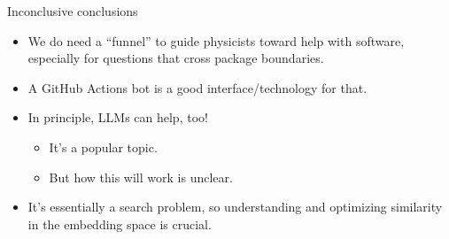 \documentclass[aspectratio=169]{beamer}
\begin{document}
\begin{frame}{Inconclusive conclusions}
\Large
\vspace{0.3 cm}
\begin{itemize}\setlength{\itemsep}{0.5 cm}
\item<1-> We do need a ``funnel'' to guide physicists toward help with software, especially for questions that cross package boundaries.
\item<2-> A GitHub Actions bot is a good interface/technology for that.
\item<3-> In principle, LLMs can help, too!
\vspace{0.25 cm}
\begin{itemize}\Large\setlength{\itemsep}{0.25 cm}
\item \Large It's a popular topic.
\item \Large But how this will work is unclear.
\end{itemize}
\item<4-> It's essentially a search problem, so understanding and optimizing similarity in the embedding space is crucial.
\end{itemize}
\end{frame}
\end{document}
